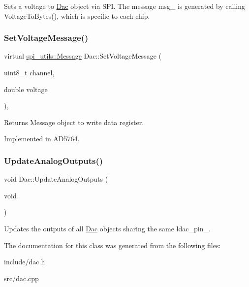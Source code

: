 Sets a voltage to \mbox{\hyperlink{classDac}{Dac}} object via S\+PI. The message msg\+\_\+ is generated by calling Voltage\+To\+Bytes(), which is specific to each chip. \mbox{\label{classDac_a87132e3c19313742d92f57d9b792e0e0}} 
\subsubsection{\texorpdfstring{Set\+Voltage\+Message()}{SetVoltageMessage()}}
{\footnotesize\ttfamily virtual \mbox{\hyperlink{structspi__utils_1_1Message}{spi\+\_\+utils\+::\+Message}} Dac\+::\+Set\+Voltage\+Message (\begin{DoxyParamCaption}\item[{uint8\+\_\+t}]{channel,  }\item[{double}]{voltage }\end{DoxyParamCaption})\hspace{0.3cm}{\ttfamily [protected]}, {}}

Returns Message object to write data register. 

Implemented in \mbox{\hyperlink{classAD5764_a62887ed89fedc4db68f2a54324e1fac0}{A\+D5764}}.

\mbox{\label{classDac_aafef1707ec33a2166a69e9b646cd471b}} 
\subsubsection{\texorpdfstring{Update\+Analog\+Outputs()}{UpdateAnalogOutputs()}}
{\footnotesize\ttfamily void Dac\+::\+Update\+Analog\+Outputs (\begin{DoxyParamCaption}\item[{void}]{ }\end{DoxyParamCaption})}

Updates the outputs of all \mbox{\hyperlink{classDac}{Dac}} objects sharing the same ldac\+\_\+pin\+\_\+. 

The documentation for this class was generated from the following files\+:\begin{DoxyCompactItemize}
\item 
include/dac.\+h\item 
src/dac.\+cpp\end{DoxyCompactItemize}
